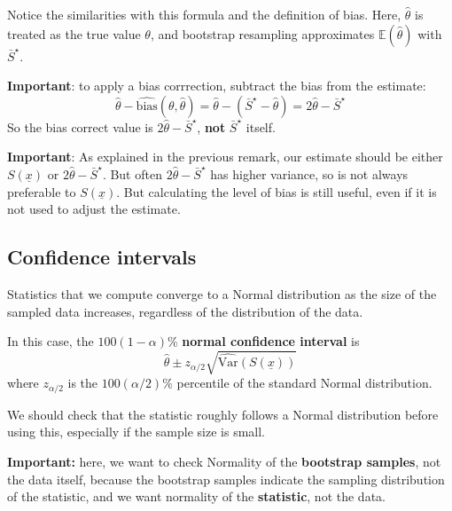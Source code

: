 \begin{remark}
	Notice the similarities with this formula and the definition of bias. Here, $\hat{\theta}$ is treated as the true value $\theta$, and bootstrap resampling approximates $\mathbb{E}(\hat{\theta})$ with $\bar{S}^{\star}$.
\end{remark}

\begin{remark}
	\textbf{Important}: to apply a bias corrrection, subtract the bias from the estimate:
	\[
		\hat{\theta} - \widehat{\text{bias}}(\theta, \hat{\theta}) = \hat{\theta} - (\bar{S}^{\star} - \hat{\theta}) = 2 \hat{\theta} - \bar{S}^{\star}
	\]
	So the bias correct value is $2 \hat{\theta} - \bar{S}^{\star}$, \textbf{not} $\bar{S}^{\star}$ itself.
\end{remark}

\begin{remark}
	\textbf{Important}: As explained in the previous remark, our estimate should be either $S(\underline{x})$ or $2 \hat{\theta} - \bar{S}^{\star}$. But often $2 \hat{\theta} - \bar{S}^{\star}$ has higher variance, so is not always preferable to $S(\underline{x})$. But calculating the level of bias is still useful, even if it is not used to adjust the estimate.
\end{remark}

\subsection{Confidence intervals}

\begin{definition}
	Statistics that we compute converge to a Normal distribution as the size of the sampled data increases, regardless of the distribution of the data.

	In this case, the $100(1 - \alpha)\%$ \textbf{normal confidence interval} is
	\[
		\hat{\theta} \pm z_{\alpha / 2} \sqrt{\widehat{\text{Var}}(S(\underline{x}))}
	\]
	where $z_{\alpha / 2}$ is the $100(\alpha / 2)\%$ percentile of the standard Normal distribution.
\end{definition}

\begin{remark}
	We should check that the statistic roughly follows a Normal distribution before using this, especially if the sample size is small.
\end{remark}

\begin{remark}
	\textbf{Important:} here, we want to check Normality of the \textbf{bootstrap samples}, not the data itself, because the bootstrap samples indicate the sampling distribution of the statistic, and we want normality of the \textbf{statistic}, not the data.
\end{remark}

